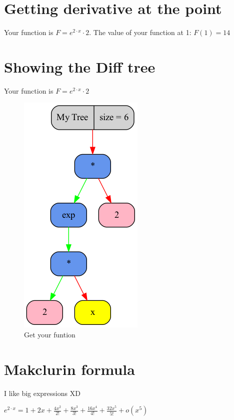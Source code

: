 \documentclass[12pt, letterpaper, twoside]{article}
\begin{document}
\section{Getting derivative at the point}
\begin{center}
Your function is $F = e^{2 \cdot x} \cdot 2$.
The value of your function at 1: $ F(1) = 14 $
\end{center}
\newpage
\section{Showing the Diff tree}
\begin{center}
Your function is $F = e^{2 \cdot x} \cdot 2$\newline 
\begin{figure}
\begin{center}
\includegraphics [scale = 0.4]{graphics/graph3.png}
\caption{Get your funtion}
\end{center}
\end{figure}
\end{center}
\newpage
\section{Makclurin formula}
I like big expressions XD\\
\begin{center}
$e^{2 \cdot x} =  1 +  2x + \frac{4x^{2}}{2!} + \frac{8x^{3}}{3!} + \frac{16x^{4}}{4!} + \frac{32x^{5}}{5!} + o(x^{5}) $
\end{center}
\end{document}
